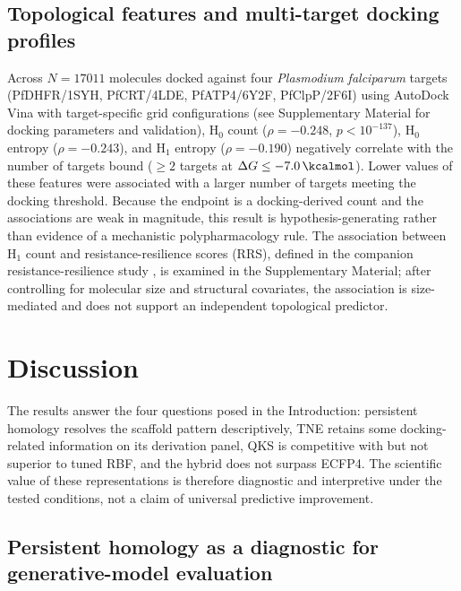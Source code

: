 \documentclass[pdflatex,sn-mathphys-num]{sn-jnl}%
\begin{document}
\subsection{Topological features and multi-target docking profiles}
\label{sec:tda_promiscuity}

Across $N = \num{17011}$ molecules docked against four \textit{Plasmodium falciparum} targets (PfDHFR/1SYH, PfCRT/4LDE, PfATP4/6Y2F, PfClpP/2F6I) using AutoDock Vina with target-specific grid configurations (see Supplementary Material for docking parameters and validation), H$_0$ count ($\rho = -\num{0.248}$, $p < 10^{-137}$), H$_0$ entropy ($\rho = -\num{0.243}$), and H$_1$ entropy ($\rho = -\num{0.190}$) negatively correlate with the number of targets bound ($\geq 2$ targets at $\Delta G \leq -\SI{7.0}{\kcalmol}$). Lower values of these features were associated with a larger number of targets meeting the docking threshold. Because the endpoint is a docking-derived count and the associations are weak in magnitude, this result is hypothesis-generating rather than evidence of a mechanistic polypharmacology rule. The association between H$_1$ count and resistance-resilience scores (RRS), defined in the companion resistance-resilience study \cite{temgoua2026tb}, is examined in the Supplementary Material; after controlling for molecular size and structural covariates, the association is size-mediated and does not support an independent topological predictor.


\section{Discussion}\label{sec:discussion}

The results answer the four questions posed in the Introduction: persistent homology resolves the scaffold pattern descriptively, TNE retains some docking-related information on its derivation panel, QKS is competitive with but not superior to tuned RBF, and the hybrid does not surpass ECFP4. The scientific value of these representations is therefore diagnostic and interpretive under the tested conditions, not a claim of universal predictive improvement.

\subsection{Persistent homology as a diagnostic for generative-model evaluation}
\end{document}
